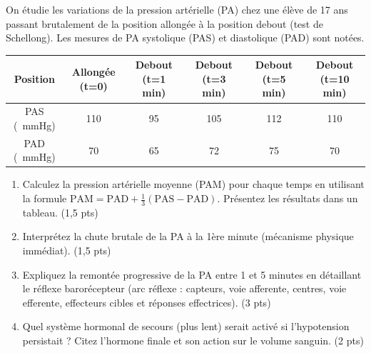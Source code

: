 \documentclass[11pt]{article}
\begin{document}
\begin{exercice}
On étudie les variations de la pression artérielle (PA) chez une élève de 17 ans passant brutalement de la position allongée à la position debout (test de Schellong). Les mesures de PA systolique (PAS) et diastolique (PAD) sont notées.

\begin{center}
\begin{tabular}{|c|c|c|c|c|c|}
\hline
Position & Allongée (t=0) & Debout (t=1 min) & Debout (t=3 min) & Debout (t=5 min) & Debout (t=10 min) \\
\hline
PAS (\SI{}{mmHg}) & 110 & 95 & 105 & 112 & 110 \\
\hline
PAD (\SI{}{mmHg}) & 70 & 65 & 72 & 75 & 70 \\
\hline
\end{tabular}
\end{center}

\begin{enumerate}
    \item Calculez la pression artérielle moyenne (PAM) pour chaque temps en utilisant la formule $\text{PAM} = \text{PAD} + \frac{1}{3}(\text{PAS} - \text{PAD})$. Présentez les résultats dans un tableau. \hfill (1,5 pts)
    \item Interprétez la chute brutale de la PA à la 1ère minute (mécanisme physique immédiat). \hfill (1,5 pts)
    \item Expliquez la remontée progressive de la PA entre 1 et 5 minutes en détaillant le réflexe barorécepteur (arc réflexe : capteurs, voie afferente, centres, voie efferente, effecteurs cibles et réponses effectrices). \hfill (3 pts)
    \item Quel système hormonal de secours (plus lent) serait activé si l'hypotension persistait ? Citez l'hormone finale et son action sur le volume sanguin. \hfill (2 pts)
\end{enumerate}
\end{exercice}
\end{document}
